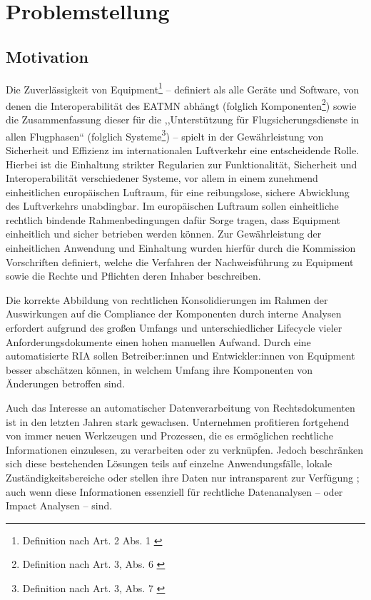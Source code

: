 \chapter{Problemstellung}
    \section{Motivation}

        Die Zuverlässigkeit von \atmans{} Equipment\footnote{Definition nach  Art. 2 Abs. 1 \cite{2023R1769}}  -- definiert als alle Geräte und Software, von denen die Interoperabilität des \ac{EATMN} abhängt (folglich \atmans{} Komponenten\footnote{Definition nach  Art. 3, Abs. 6 \cite{2018R1139}})  sowie die Zusammenfassung dieser für die ,,Unterstützung für Flugsicherungsdienste in allen Flugphasen`` (folglich \atmans{} Systeme\footnote{Definition nach  Art. 3, Abs. 7 \cite{2018R1139}}) -- spielt in der Gewährleistung von Sicherheit und Effizienz im internationalen Luftverkehr eine entscheidende Rolle. 
        Hierbei ist die Einhaltung strikter Regularien zur Funktionalität, Sicherheit und Interoperabilität verschiedener Systeme, vor allem in einem zunehmend einheitlichen europäischen Luftraum, für eine reibungslose, sichere Abwicklung des Luftverkehrs unabdingbar. 
        Im europäischen Luftraum sollen einheitliche rechtlich bindende Rahmenbedingungen dafür Sorge tragen, dass \atmans{} Equipment einheitlich und sicher betrieben werden können.
        Zur Gewährleistung der einheitlichen Anwendung und Einhaltung wurden hierfür durch die Kommission Vorschriften definiert, welche die Verfahren der Nachweisführung zu \atmans{} Equipment sowie die Rechte und Pflichten deren Inhaber beschreiben. \cite[Art. 43]{2018R1139} 
            
        Die korrekte Abbildung von rechtlichen Konsolidierungen im Rahmen der Auswirkungen auf die Compliance der \atmans{} Komponenten durch interne Analysen erfordert aufgrund des großen Umfangs und unterschiedlicher Lifecycle vieler Anforderungsdokumente einen hohen manuellen Aufwand.
        Durch eine automatisierte \ac{RIA} sollen Betreiber:innen und Entwickler:innen von \atmans Equipment besser abschätzen können, in welchem Umfang ihre Komponenten von Änderungen betroffen sind. 

    Auch das Interesse an automatischer Datenverarbeitung von Rechtsdokumenten ist in den letzten Jahren stark gewachsen.
    Unternehmen profitieren fortgehend von immer neuen Werkzeugen und Prozessen, die es ermöglichen rechtliche Informationen einzulesen, zu verarbeiten oder zu verknüpfen.
    Jedoch beschränken sich diese bestehenden Lösungen teils auf einzelne Anwendungsfälle, lokale Zuständigkeitsbereiche oder stellen ihre Daten nur intransparent zur Verfügung \cite[385]{eu_open_legal_info}; auch wenn diese Informationen essenziell für rechtliche Datenanalysen -- oder Impact Analysen -- sind.
        
